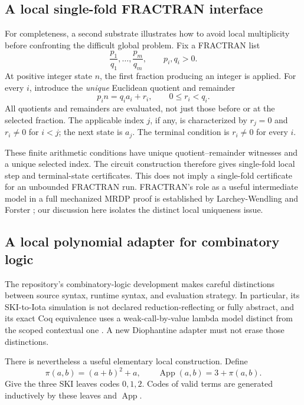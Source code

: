 \documentclass[11pt,a4paper]{article}
\theoremstyle{definition}
\theoremstyle{remark}
\begin{document}
\subsection{A local single-fold FRACTRAN interface}
For completeness, a second substrate illustrates how to avoid local
multiplicity before confronting the difficult global problem. Fix a
FRACTRAN list
\[
 \frac{p_1}{q_1},\ldots,\frac{p_m}{q_m},\qquad p_i,q_i>0.
\]
At positive integer state $n$, the first fraction producing an integer is applied.
For every $i$, introduce the \emph{unique} Euclidean quotient and remainder
\[
 p_i n=q_i a_i+r_i,\qquad 0\leq r_i<q_i.
\]
All quotients and remainders are evaluated, not just those before or at the
selected fraction. The applicable index $j$, if any, is characterized by
$r_j=0$ and $r_i\neq0$ for $i<j$; the next state is $a_j$.
The terminal condition is $r_i\neq0$ for every $i$.

These finite arithmetic conditions have unique quotient--remainder
witnesses and a unique selected index. The circuit construction therefore
gives single-fold local step and terminal-state certificates. This does
not imply a single-fold certificate for an unbounded FRACTRAN run.
FRACTRAN's role as a useful intermediate model in a full mechanized MRDP
proof is established by Larchey-Wendling and Forster
\cite{lf2022}; our discussion here isolates the distinct local
uniqueness issue.


\subsection{A local polynomial adapter for combinatory logic}
The repository's combinatory-logic development makes careful distinctions between source syntax, runtime syntax, and evaluation strategy. In particular, its SKI-to-Iota simulation is not declared reduction-reflecting or fully abstract, and its exact Coq equivalence uses a weak-call-by-value lambda model distinct from the scoped contextual one \cite{repo-cl}. A new Diophantine adapter must not erase those distinctions.

There is nevertheless a useful elementary local construction. Define
\begin{equation}\label{cdc:ct:eq:pairing}
 \pi(a,b)=(a+b)^2+a,\qquad \operatorname{App}(a,b)=3+\pi(a,b).
\end{equation}
Give the three SKI leaves codes $0,1,2$. Codes of valid terms are generated inductively by these leaves and $\operatorname{App}$.
\end{document}
